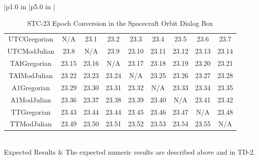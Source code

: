 \begin{table}[htbp!]
\begin{tabular}{|p{1.0 in} |p{5.0 in} |}
\begin{centering}
\begin{tabular}{|c|c|c|c|c|c|c|c|c|}
             \rotatebox{90}{ TTGregorian  }  &
             \rotatebox{90}{ TTModJulian  }  \\ \hline
             UTCGregorian & N/A & 23.1 & 23.2 & 23.3 & 23.4 & 23.5 & 23.6 & 23.7 \\ \hline
             UTCModJulian & 23.8 & N/A & 23.9 & 23.10 & 23.11 & 23.12 & 23.13 & 23.14\\ \hline
             TAIGregorian & 23.15 & 23.16 & N/A & 23.17 & 23.18 & 23.19 & 23.20 & 23.21\\ \hline
             TAIModJulian & 23.22 & 23.23 & 23.24 & N/A & 23.25 & 23.26 & 23.27 & 23.28\\ \hline
             A1Gregorian & 23.29 & 23.30 & 23.31 & 23.32 & N/A & 23.33 & 23.34 & 23.35\\ \hline
             A1ModJulian & 23.36 & 23.37 & 23.38 & 23.39 & 23.40 &  N/A & 23.41 & 23.42\\ \hline
             TTGregorian & 23.43 & 23.44 & 23.44 & 23.45 & 23.46 & 23.47 & N/A & 23.48\\ \hline
             TTModJulian & 23.49 & 23.50 & 23.51 & 23.52 & 23.53 & 23.54 & 23.55 & N/A\\ \hline
          \end{tabular}
          \end{centering} \vspace{0.1 in}\\
         \hline
         Expected Results & The expected numeric results are described above and in TD-2.\\
      \hline
\end{tabular}
   \label{Table:STC-23}
   \caption{STC-23 Epoch Conversion in the Spacecraft Orbit Dialog Box}
\end{table} 